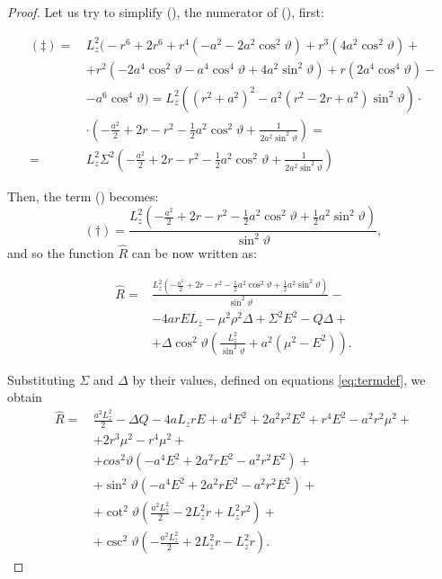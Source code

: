 \begin{proof}
	Let us try to simplify (\ddag), the numerator of (\dag), first:
	
	\begin{align}
	(\ddag) =\,& L_z^2 \Biggl( -r^6 + 2r^6 + r^4 \left( -a^2 - 2a^2\cos^2\vartheta \right) + r^3\left(4 a^2 \cos^2\vartheta \right) + \nonumber \\
	&+ r^2 \left( -2a^4\cos^2\vartheta - a^4\cos^4\vartheta + 4a^2\sin^2\vartheta\right) + r\left(2a^4\cos^4\vartheta\right) - \nonumber \\
	&- a^6\cos^4\vartheta \Biggr) = L_z^2 \left( \left(r^2 + a^2\right)^2 - a^2 \left(r^2 - 2r + a^2\right)\sin^2\vartheta \right) \cdot \nonumber \\
	&\cdot \left( -\frac{a^2}{2} + 2r - r^2 - \frac{1}{2}a^2\cos^2\vartheta + \frac{1}{2a^2\sin^2\vartheta} \right) = \nonumber\\
	=\,& L_z^2 \Sigma^2 \left( -\frac{a^2}{2} + 2r - r^2 - \frac{1}{2}a^2\cos^2\vartheta + \frac{1}{2a^2\sin^2\vartheta} \right)
	\end{align}
	
	Then, the term (\dag) becomes:
	\[
	(\dag) = \frac{L_z^2 \left( -\frac{a^2}{2} + 2r - r^2 - \frac{1}{2}a^2\cos^2\vartheta + \frac{1}{2}a^2\sin^2\vartheta\right) }{\sin^2\vartheta},
	\]
	and so the function $\widehat{R}$ can be now written as:
	
	\begin{align}
	\widehat{R} =& \frac{L_z^2 \left( -\frac{a^2}{2} + 2r - r^2 - \frac{1}{2}a^2\cos^2\vartheta + \frac{1}{2}a^2\sin^2\vartheta\right) }{\sin^2\vartheta} - \nonumber\\
	&- 4 a r E L_z - \mu^2 \rho^2 \Delta + \Sigma^2 E^2 - Q \Delta + \nonumber \\ 
	&+ \Delta\cos^2\vartheta\left(\frac{L_z^2}{\sin^2\vartheta} + a^2\left(\mu^2 - E^2\right)\right).
	\end{align}
	
	Substituting $\Sigma$ and $\Delta$ by their values, defined on equations \ref{eq:termdef}, we obtain
	\begin{align}
	\widehat{R} =\,& \frac{a^2L_z^2}{2} - \Delta Q - 4aL_zrE + a^4E^2 + 2a^2r^2E^2 + r^4E^2 - a^2r^2\mu^2 + \nonumber \\
	&+ 2r^3\mu^2 - r^4\mu^2 + \nonumber\\
	&+ cos^2\vartheta\left(-a^4E^2 + 2a^2rE^2 - a^2r^2E^2 \right) + \nonumber \\
	&+ \sin^2\vartheta\left( -a^4E^2 + 2a^2rE^2 - a^2r^2E^2 \right) + \nonumber\\
	&+ \cot^2\vartheta\left( \frac{a^2L_z^2}{2} - 2L_z^2r + L_z^2r^2 \right) + \nonumber \\
	&+ \csc^2\vartheta\left( -\frac{a^2L_z^2}{2} + 2L_z^2r - L_z^2r \right).
	\end{align}
	

\end{proof}
